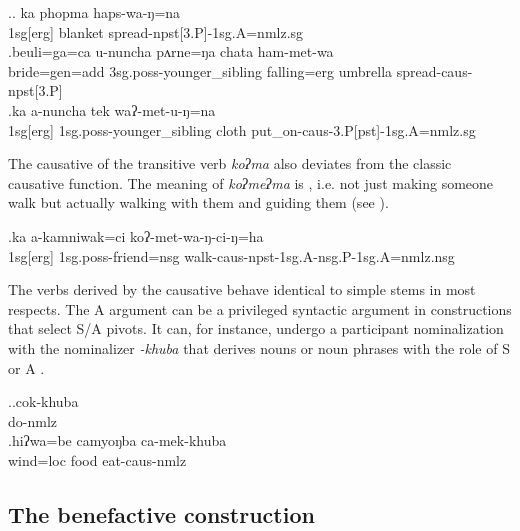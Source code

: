 \ex.\ag. ka phopma haps-wa-ŋ=na\\ 
{\sc 1sg[erg]} blanket spread{\sc -npst[3.P]-1sg.A=nmlz.sg}\\
\bg.beuli=ga=ca  u-nuncha pʌrne=ŋa   chata    ham-met-wa\\
bride{\sc =gen=add} {\sc 3sg.poss-}younger\_sibling falling{\sc =erg} umbrella spread{\sc -caus-npst[3.P]}\\
  
\bg.ka a-nuncha tek waʔ-met-u-ŋ=na\\
{\sc 1sg[erg]}  {\sc 1sg.poss-}younger\_sibling cloth put\_on{\sc -caus-3.P[pst]-1sg.A=nmlz.sg}\\


The causative of the transitive verb \emph{koʔma}  also deviates  from the classic causative function. The meaning of \emph{koʔmeʔma} is , i.e. not just making someone walk but actually walking with them and guiding them (see \Next). 

\exg.ka a-kamniwak=ci  koʔ-met-wa-ŋ-ci-ŋ=ha\\
{\sc 1sg[erg]}  {\sc 1sg.poss-}friend{\sc =nsg} walk{\sc -caus-npst-1sg.A-nsg.P-1sg.A=nmlz.nsg} \\
 
  
 
The verbs derived by the causative behave identical to simple stems in most respects. The A argument can be a privileged syntactic argument in constructions that select S/A pivots. It can, for instance, undergo a participant nominalization with the nominalizer \emph{-khuba} that derives nouns or noun phrases with the role of S or A \Next.  
 
 \ex.\ag.cok-khuba\\
do{\sc -nmlz}\\
\bg.hiʔwa=be    camyoŋba ca-mek-khuba  \\
wind{\sc =loc} food eat{\sc -caus-nmlz}\\




\subsection{The benefactive construction}\label{benefactive}

